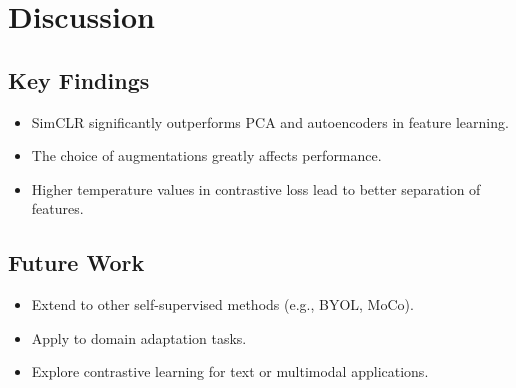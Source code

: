 \documentclass[11pt]{article}
\begin{document}
\section{Discussion}

\subsection{Key Findings}
\begin{itemize}
  \item SimCLR significantly outperforms PCA and autoencoders in feature learning.
  \item The choice of augmentations greatly affects performance.
  \item Higher temperature values in contrastive loss lead to better separation of features.
\end{itemize}

\subsection{Future Work}
\begin{itemize}
  \item Extend to other self-supervised methods (e.g., BYOL, MoCo).
  \item Apply to domain adaptation tasks.
  \item Explore contrastive learning for text or multimodal applications.
\end{itemize}
\end{document}
